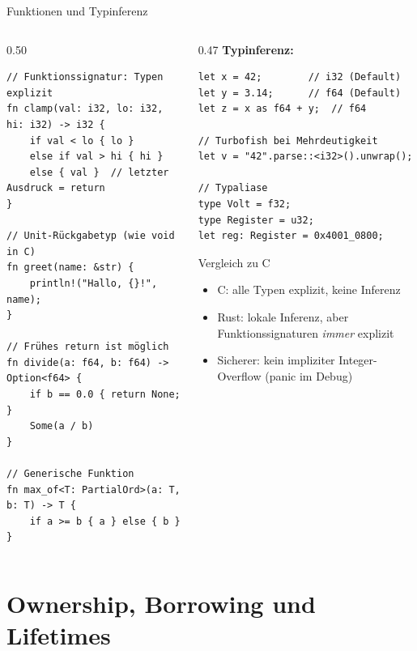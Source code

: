\documentclass[%
  aspectratio=169,
  10pt
]{beamer}
\begin{document}
\begin{frame}[fragile]{Funktionen und Typinferenz}
  \begin{columns}[T]
    \begin{column}{0.50\textwidth}
\begin{lstlisting}
// Funktionssignatur: Typen explizit
fn clamp(val: i32, lo: i32, hi: i32) -> i32 {
    if val < lo { lo }
    else if val > hi { hi }
    else { val }  // letzter Ausdruck = return
}

// Unit-Rückgabetyp (wie void in C)
fn greet(name: &str) {
    println!("Hallo, {}!", name);
}

// Frühes return ist möglich
fn divide(a: f64, b: f64) -> Option<f64> {
    if b == 0.0 { return None; }
    Some(a / b)
}

// Generische Funktion
fn max_of<T: PartialOrd>(a: T, b: T) -> T {
    if a >= b { a } else { b }
}
\end{lstlisting}
    \end{column}
    \begin{column}{0.47\textwidth}
      \textbf{Typinferenz:}
\begin{lstlisting}
let x = 42;        // i32 (Default)
let y = 3.14;      // f64 (Default)
let z = x as f64 + y;  // f64

// Turbofish bei Mehrdeutigkeit
let v = "42".parse::<i32>().unwrap();

// Typaliase
type Volt = f32;
type Register = u32;
let reg: Register = 0x4001_0800;
\end{lstlisting}
      \begin{block}{Vergleich zu C}
        \small
        \begin{itemize}
          \item C: alle Typen explizit, keine Inferenz
          \item Rust: lokale Inferenz, aber
                Funktionssignaturen \emph{immer} explizit
          \item Sicherer: kein impliziter
                Integer-Overflow (panic im Debug)
        \end{itemize}
      \end{block}
    \end{column}
  \end{columns}
\end{frame}

\section{Ownership, Borrowing und Lifetimes}
\end{document}
